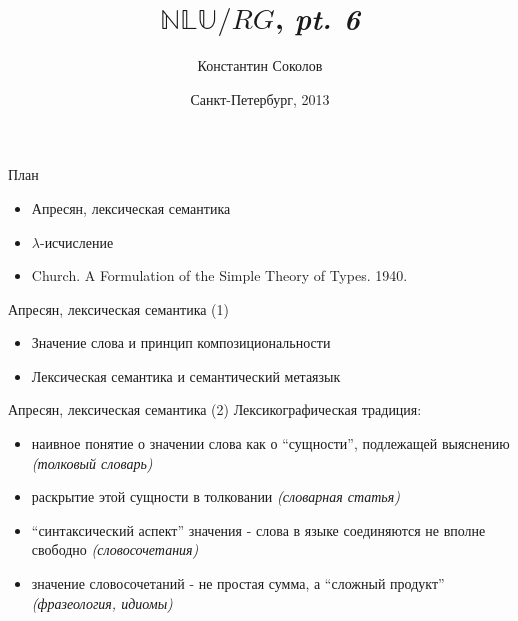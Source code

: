 \documentclass{beamer}
\begin{document}
\title{\huge{$\mathbb{NLU}/RG$, \textit{pt. 6}}}
\author{Константин Соколов}
\date{Санкт-Петербург, 2013} 
\begin{frame}
    \thispagestyle{empty}
    \titlepage
\end{frame}

\begin{frame}{План}
    \setcounter{framenumber}{1}
    \begin{itemize}
        \item Апресян, лексическая семантика
        \item $\lambda$-исчисление
        \item Church. A Formulation of the Simple Theory of Types. 1940.
    \end{itemize}
\end{frame}

\begin{frame}{Апресян, лексическая семантика (1)}
\begin{itemize}
  \item Значение слова и принцип композициональности
  \item Лексическая семантика и семантический метаязык
\end{itemize}
\end{frame}

\begin{frame}{Апресян, лексическая семантика (2)}
Лексикографическая традиция:\\
\bigskip
\begin{itemize}
  \item наивное понятие о значении слова как о ``сущности'', подлежащей выяснению \textit{(толковый словарь)} 
  \item раскрытие этой сущности в толковании \textit{(словарная статья)}
  \item ``синтаксический аспект'' значения - слова в языке соединяются не вполне свободно \textit{(словосочетания)}
  \item значение словосочетаний - не простая сумма, а ``сложный продукт'' \textit{(фразеология, идиомы)}
\end{itemize}
\end{frame}
\end{document}

